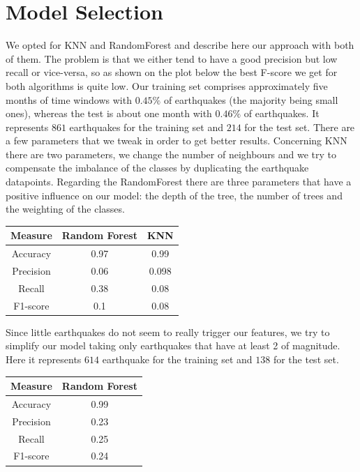 \documentclass[10pt,conference,compsocconf]{IEEEtran}
\begin{document}
\section{Model Selection}
We opted for KNN and RandomForest and describe here our approach with both of them. The problem is that we either tend to have a good precision but low recall or vice-versa, so as shown on the plot below the best F-score we get for both algorithms is quite low. Our training set comprises approximately five months of time windows with $0.45\%$ of earthquakes (the majority being small ones), whereas the test is about one month with $0.46\%$ of earthquakes. It represents $861$ earthquakes for the training set and $214$ for the test set. There are a few parameters that we tweak in order to get better results. Concerning KNN there are two parameters, we change the number of neighbours and we try to compensate the imbalance of the classes by duplicating the earthquake datapoints. Regarding the RandomForest there are three parameters that have a positive influence on our model: the depth of the tree, the number of trees and the weighting of the classes. 

\begin{center}
 \begin{tabular}{||c c c||} 
 \hline
 Measure & Random Forest & KNN \\ [0.5ex] 
 \hline\hline
 Accuracy & 0.97 & 0.99 \\ 
 \hline
 Precision & 0.06 & 0.098 \\
 \hline
 Recall & 0.38 & 0.08 \\
 \hline
 F1-score & 0.1 & 0.08 \\ [1ex]
 \hline
\end{tabular}
\end{center}

Since little earthquakes do not seem to really trigger our features, we try to simplify our model taking only earthquakes that have at least 2 of magnitude. Here it represents $614$ earthquake for the training set and $138$ for the test set. 

\begin{center}
 \begin{tabular}{||c c||} 
 \hline
 Measure & Random Forest \\ [0.5ex] 
 \hline\hline
 Accuracy & 0.99 \\ 
 \hline
 Precision & 0.23 \\
 \hline
 Recall & 0.25 \\
 \hline
 F1-score & 0.24 \\ [1ex]
 \hline
\end{tabular}
\end{center}
\end{document}
